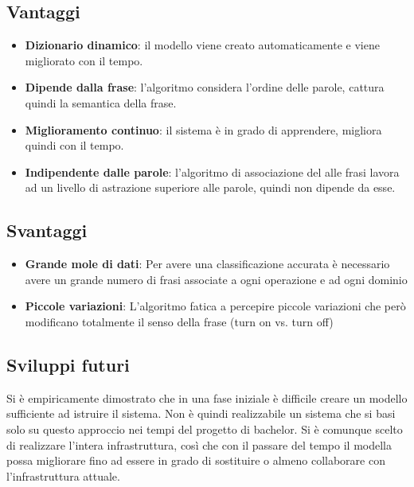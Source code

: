 \documentclass[twoside]{supsistudent}
\begin{document}
\subsection{Vantaggi}
\begin{itemize}
  \item \textbf{Dizionario dinamico}: il modello viene creato automaticamente e viene migliorato con il tempo.
  \item \textbf{Dipende dalla frase}: l'algoritmo considera l'ordine delle parole, cattura quindi la semantica della frase.
  \item \textbf{Miglioramento continuo}: il sistema è in grado di apprendere, migliora quindi con il tempo.
  \item \textbf{Indipendente dalle parole}: l'algoritmo di associazione del alle frasi lavora ad un livello di astrazione superiore alle parole, quindi non dipende da esse.
\end{itemize}
\subsection{Svantaggi}
\begin{itemize}
  \item \textbf{Grande mole di dati}: Per avere una classificazione accurata è necessario avere un grande numero di frasi associate a ogni operazione e ad ogni dominio
  \item \textbf{Piccole variazioni}: L'algoritmo fatica a percepire piccole variazioni che però modificano totalmente il senso della frase (turn on vs. turn off)
\end{itemize}
\subsection{Sviluppi futuri}
Si è empiricamente dimostrato che in una fase iniziale è difficile creare un modello sufficiente ad istruire il sistema. Non è quindi realizzabile un sistema che si basi solo su questo approccio nei tempi del progetto di bachelor. Si è comunque scelto di realizzare l'intera infrastruttura, così che con il passare del tempo il modella possa migliorare fino ad essere in grado di sostituire o almeno collaborare con l'infrastruttura attuale.
\newpage

\end{document}
